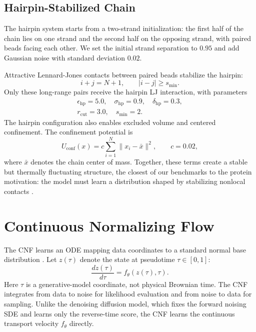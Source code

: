 \documentclass[reprint,amsmath,amssymb,aps,pra,10pt]{revtex4-2}
\begin{document}
\subsection*{Hairpin-Stabilized Chain}

The hairpin system starts from a two-strand initialization: the first half of the chain lies on one strand and the second half on the opposing strand, with paired beads facing each other.
We set the initial strand separation to $0.95$ and add Gaussian noise with standard deviation $0.02$.

Attractive Lennard-Jones contacts between paired beads stabilize the hairpin:
\begin{equation}
    i+j=N+1,
    \qquad
    |i-j| \geq s_{\min}.
\end{equation}
Only these long-range pairs receive the hairpin LJ interaction, with parameters
\begin{align}
    \epsilon_{\mathrm{hp}}=5.0,
    \quad
    \sigma_{\mathrm{hp}}=0.9,
    \quad
    \delta_{\mathrm{hp}}=0.3,
    \nonumber \\
    r_{\mathrm{cut}}=3.0,
    \quad
    s_{\min}=2.
\end{align}
The hairpin configuration also enables excluded volume and centered confinement.
The confinement potential is
\begin{equation}
    U_{\mathrm{conf}}(x)
    =
    c
    \sum_{i=1}^{N}
    \|x_i-\bar{x}\|^2,
    \qquad
    c=0.02,
\end{equation}
where $\bar{x}$ denotes the chain center of mass.
Together, these terms create a stable but thermally fluctuating structure, the closest of our benchmarks to the protein motivation: the model must learn a distribution shaped by stabilizing nonlocal contacts \cite{honda2004,satoh2006}.

\section{Continuous Normalizing Flow}

The CNF learns an ODE mapping data coordinates to a standard normal base distribution \cite{chen2018,grathwohl2018}.
Let $z(\tau)$ denote the state at pseudotime $\tau \in [0,1]$:
\begin{equation}
    \frac{dz(\tau)}{d\tau} = f_\theta(z(\tau), \tau).
\end{equation}
Here $\tau$ is a generative-model coordinate, not physical Brownian time.
The CNF integrates from data to noise for likelihood evaluation and from noise to data for sampling.
Unlike the denoising diffusion model, which fixes the forward noising SDE and learns only the reverse-time score, the CNF learns the continuous transport velocity $f_\theta$ directly.
\end{document}
